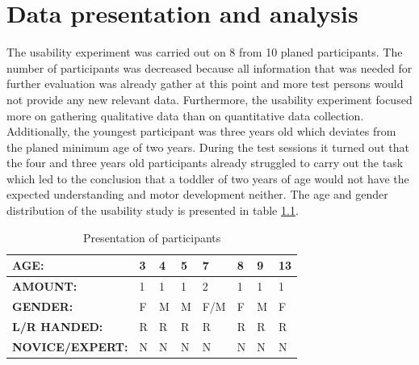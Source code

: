 \chapter{Data presentation and analysis}
\label{chap:dataanalysis}

The usability experiment was carried out on 8 from 10 planed participants. The number of participants was decreased because all information that was needed for further evaluation was already gather at this point and more test persons would not provide any new relevant data. Furthermore, the usability experiment focused more on gathering qualitative data than on quantitative data collection. Additionally, the youngest participant was three years old which deviates from the planed minimum age of two years. During the test sessions it turned out that the four and three years old participants already struggled to carry out the task which led to the conclusion that a toddler of two years of age would not have the expected understanding and motor development neither. The age and gender distribution of the usability study is presented in table \ref{tab:participanttable}. 


\renewcommand{\arraystretch}{1.5}
 \begin{table}[h]
     \centering
     \begin{tabular}{c|c|c|c|c|c|c|c}
     \hline
        \multicolumn{1}{|l|}{\textbf{AGE:}}  &
        \multicolumn{1}{l|}{3}  &     
        \multicolumn{1}{l|}{4}  & 
        \multicolumn{1}{l|}{5}  & 
        \multicolumn{1}{l|}{7}  & 
        \multicolumn{1}{l|}{8}  & 
        \multicolumn{1}{l|}{9}  & 
        \multicolumn{1}{l|}{13} \\ \hline
        \multicolumn{1}{|l|}{\textbf{AMOUNT:}} &
        \multicolumn{1}{l|}{1}  &
        \multicolumn{1}{l|}{1}  &
        \multicolumn{1}{l|}{1}  &
        \multicolumn{1}{l|}{2}  &
        \multicolumn{1}{l|}{1}  &
        \multicolumn{1}{l|}{1}  &
        \multicolumn{1}{l|}{1}  \\ \hline
        \multicolumn{1}{|l|}{\textbf{GENDER:}}  &
        \multicolumn{1}{|l|}{F} &
        \multicolumn{1}{l|}{M}  &
        \multicolumn{1}{l|}{M}  &
        \multicolumn{1}{l|}{F/M}&
        \multicolumn{1}{l|}{F}  &
        \multicolumn{1}{l|}{M}  &
        \multicolumn{1}{l|}{F}  \\ \hline
        \multicolumn{1}{|l|}{\textbf{L/R HANDED:}} &
        \multicolumn{1}{|l|}{R} &
        \multicolumn{1}{l|}{R}  &
        \multicolumn{1}{l|}{R}  &
        \multicolumn{1}{l|}{R}  &
        \multicolumn{1}{l|}{R}  &
        \multicolumn{1}{l|}{R}  &
        \multicolumn{1}{l|}{R}  \\ \hline
        \multicolumn{1}{|l|}{\textbf{NOVICE/EXPERT:}} &
        \multicolumn{1}{|l|}{N} &
        \multicolumn{1}{l|}{N}  &
        \multicolumn{1}{l|}{N}  &
        \multicolumn{1}{l|}{N}  &
        \multicolumn{1}{l|}{N}  &
        \multicolumn{1}{l|}{N}  &
        \multicolumn{1}{l|}{N}  \\ \hline
     \end{tabular}
     \caption{Presentation of participants}
     \label{tab:participanttable}
 \end{table}
 

